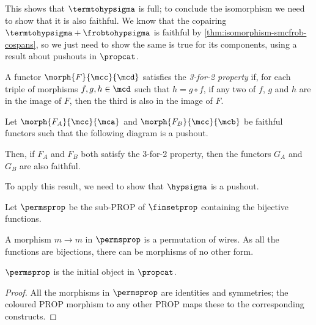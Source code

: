 This shows that \(\termtohypsigma\) is full; to conclude the isomorphism we
need to show that it is also faithful.
We know that the copairing \(\termtohypsigma + \frobtohypsigma\) is faithful
by \cref{thm:isomorphism-smcfrob-cospans}, so we just need to show the same is
true for its components, using a result about pushouts in \(\propcat\).

\begin{definition}
    A functor \(\morph{F}{\mcc}{\mcd}\) satisfies the \emph{3-for-2 property}
    if, for each triple of morphisms \(f,g,h \in \mcd\) such that
    \(h = g \circ f\), if any two of \(f\), \(g\) and \(h\) are in the image of
    \(F\), then the third is also in the image of \(F\).
\end{definition}

\begin{theorem}
    \label{thm:faithful-pushout}
    Let \(\morph{F_A}{\mcc}{\mca}\) and \(\morph{F_B}{\mcc}{\mcb}\) be faithful
    functors such that the following diagram is a pushout.
    \begin{center}
        
    \end{center}
    Then, if \(F_A\) and \(F_B\) both satisfy the 3-for-2 property, then the
    functors \(G_A\) and \(G_B\) are also faithful.
\end{theorem}

To apply this result, we need to show that \(\hypsigma\) is a pushout.

\begin{definition}
    Let \(\permsprop\) be the sub-PROP of \(\finsetprop\)
    containing the bijective functions.
\end{definition}

A morphism \(m \to m\) in \(\permsprop\) is a
permutation of wires.
As all the functions are bijections, there can be morphisms of no other form.

\begin{lemma}\label{lem:perms-initial}
    \(\permsprop\) is the initial object in \(\propcat\).
\end{lemma}
\begin{proof}
    All the morphisms in \(\permsprop\) are identities and symmetries; the
    coloured PROP morphism to any other PROP maps these to the corresponding
    constructs.
\end{proof}

